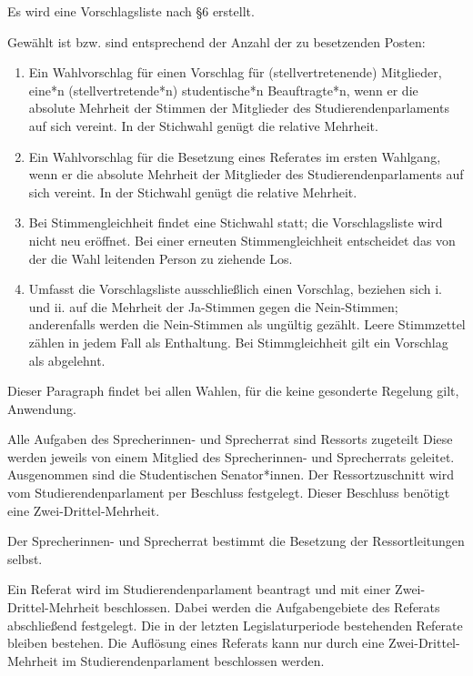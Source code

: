 \documentclass[10pt,a4paper]{scrartcl}
\begin{document}
\begin{contract}
Es wird eine Vorschlagsliste nach §6
erstellt.

Gewählt ist bzw. sind entsprechend der Anzahl der zu
besetzenden Posten: 
\begin{enumerate}
\item Ein Wahlvorschlag für einen Vorschlag für
(stellvertretenende) Mitglieder, eine*n (stellvertretende*n)
studentische*n Beauftragte*n, wenn er die absolute Mehrheit der Stimmen
der Mitglieder des Studierendenparlaments auf sich vereint. In der
Stichwahl genügt die relative Mehrheit. 
\item Ein Wahlvorschlag für die
Besetzung eines Referates im ersten Wahlgang, wenn er die absolute
Mehrheit der Mitglieder des Studierendenparlaments auf sich vereint. In
der Stichwahl genügt die relative Mehrheit.
\item Bei Stimmengleichheit
findet eine Stichwahl statt; die Vorschlagsliste wird nicht neu
eröffnet. Bei einer erneuten Stimmengleichheit entscheidet das von der
die Wahl leitenden Person zu ziehende Los.
\item Umfasst die
Vorschlagsliste ausschließlich einen Vorschlag, beziehen sich i. und ii.
auf die Mehrheit der Ja-Stimmen gegen die Nein-Stimmen; anderenfalls
werden die Nein-Stimmen als ungültig gezählt. Leere Stimmzettel zählen
in jedem Fall als Enthaltung. Bei Stimmgleichheit gilt ein Vorschlag als
abgelehnt.
\end{enumerate}

Dieser Paragraph findet bei allen Wahlen, für die keine
gesonderte Regelung gilt, Anwendung.


\label{der-sprecherinnen--und-sprecherrat}

Alle Aufgaben des Sprecherinnen- und Sprecherrat sind Ressorts zugeteilt Diese
werden jeweils von einem Mitglied des Sprecherinnen- und Sprecherrats geleitet.
Ausgenommen sind die Studentischen Senator*innen. Der Ressortzuschnitt wird
vom Studierendenparlament per Beschluss festgelegt. Dieser Beschluss benötigt
eine Zwei-Drittel-Mehrheit.

Der Sprecherinnen- und Sprecherrat bestimmt die Besetzung der Ressortleitungen
selbst.

Ein Referat wird im Studierendenparlament beantragt und mit einer
Zwei-Drittel-Mehrheit beschlossen. Dabei werden die Aufgabengebiete des Referats
abschließend festgelegt. Die in der letzten Legislaturperiode bestehenden
Referate bleiben bestehen. Die Auflösung eines Referats kann nur durch eine
Zwei-Drittel-Mehrheit im Studierendenparlament beschlossen werden.


\end{contract}
\end{document}
